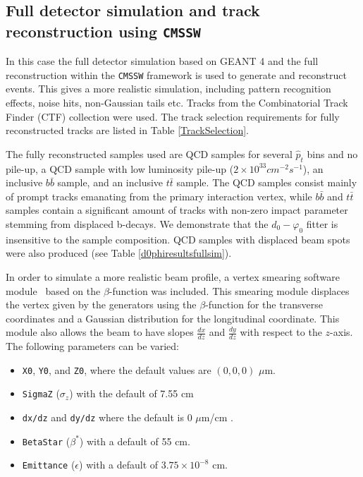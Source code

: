\documentclass{cmspaper}
\begin{document}
\subsection{\label{sec:full_MC}Full detector simulation and track reconstruction using \texttt{CMSSW}}
In this case the full detector simulation based on GEANT 4 and the full reconstruction 
within the \texttt{CMSSW} framework is used to generate and reconstruct events. This gives a more 
realistic simulation, including pattern recognition effects, noise hits, non-Gaussian tails etc. Tracks from the Combinatorial Track Finder (CTF) \cite{CTF} collection were used.
The track selection requirements for fully reconstructed tracks are listed in Table \ref{TrackSelection}.

The fully reconstructed samples used are QCD samples for several $\hat{p}_t$ bins and no pile-up, a QCD sample with low luminosity pile-up
($2\times10^{33}cm^{-2} s^{-1}$), an inclusive $b\bar{b}$ sample,
and an inclusive $t\bar{t}$ sample. The QCD samples consist mainly of prompt tracks emanating from the primary interaction vertex, while  $b\bar{b}$ and $t\bar{t}$ samples contain a significant amount of tracks with non-zero impact parameter  stemming from displaced b-decays. We demonstrate that the $d_0-\varphi_0$ fitter
is insensitive to the sample composition. QCD samples with displaced beam spots were also produced (see Table \ref{d0phiresultsfullsim}). 

In order to simulate a more realistic beam profile, a vertex smearing software module~\cite{VtxSmearingPkg}
based on the $\beta$-function was included. This smearing module displaces the vertex given by the
generators using the $\beta$-function for the transverse coordinates and a Gaussian 
distribution for the longitudinal coordinate. This module also allows  the beam to have slopes
$\frac{dx}{dz}$ and $\frac{dy}{dz}$ with respect to the $z$-axis. The following parameters can be varied:

\begin{itemize}
\item \texttt{X0}, \texttt{Y0}, and \texttt{Z0}, where the default values are $(0,0,0)$ $\mu$m. 
\item \texttt{SigmaZ} ($\sigma_z$) with the default of 7.55 cm 
\item \texttt{dx/dz} and \texttt{dy/dz} where the default is 0 $\mu$m/cm . 
\item \texttt{BetaStar} ($\beta^*$) with a default of 55 cm. 
\item \texttt{Emittance} ($\epsilon$) with a default of $3.75\times10^{-8}$ cm. 
\end{itemize}
 
\end{document}
